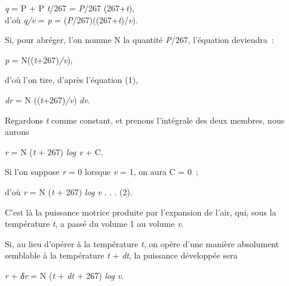 \documentclass[french,twoside]{book} %
\begin{document}
{\begin{center}
\noindent \emph{q} = P + P \emph{t}/267 = \emph{P}/267 (267+\emph{t}), \\
d’où \emph{q/v} = \emph{p} = (\emph{P}/267)((267+\emph{t})/\emph{v}).\par
\end{center}

 \noindent Si, pour abréger, l’on nomme N la quantité \emph{P}/267, l’équation deviendra :\par
 
\begin{center}
\noindent \emph{p} = N((\emph{t}+267)\emph{/v}),\par
\end{center}

 \noindent d’où l’on tire, d’après l’équation (1),\par
 
\begin{center}
\noindent \emph{dr} = N ((\emph{t}+267)\emph{/v}) \emph{dv}.\par
\end{center}

 \noindent Regardons \emph{t} comme constant, et prenons l’intégrale des deux membres, nous aurons\par
 
\begin{center}
\noindent \emph{r} = N (\emph{t} + 267) \emph{log v} + C.\par
\end{center}

 \noindent Si l’on suppose \emph{r} = 0 lorsque \emph{v} = 1, on aura C = 0 ;\par
 
\begin{center}
\noindent d’où \emph{r} = N (\emph{t} + 267) \emph{log v} . . . (2).\par
\end{center}

 \noindent C’est là la puissance motrice produite par l’expansion de l’air, qui, sous la température \emph{t}, a passé du volume 1 au volume \emph{v}.\par
 Si, au lieu d’opérer à la température \emph{t}, on opère d’une manière absolument semblable à la température \emph{t} + \emph{dt}, la puissance développée sera\par
 
\begin{center}
\noindent \emph{r} + \emph{δr} = N (\emph{t} + \emph{dt} + 267) \emph{log v}.\par
\end{center}

}
\end{document}
